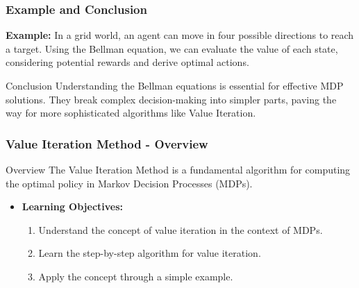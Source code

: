\documentclass[aspectratio=169]{beamer}
\begin{document}
\begin{frame}[fragile]
    \frametitle{Example and Conclusion}
    
    \textbf{Example:} In a grid world, an agent can move in four possible directions to reach a target. Using the Bellman equation, we can evaluate the value of each state, considering potential rewards and derive optimal actions.

    \begin{block}{Conclusion}
        Understanding the Bellman equations is essential for effective MDP solutions. They break complex decision-making into simpler parts, paving the way for more sophisticated algorithms like Value Iteration.
    \end{block}
\end{frame}

\begin{frame}[fragile]
    \frametitle{Value Iteration Method - Overview}
    \begin{block}{Overview}
        The Value Iteration Method is a fundamental algorithm for computing the optimal policy in Markov Decision Processes (MDPs).
    \end{block}
    \begin{itemize}
        \item \textbf{Learning Objectives:}
        \begin{enumerate}
            \item Understand the concept of value iteration in the context of MDPs.
            \item Learn the step-by-step algorithm for value iteration.
            \item Apply the concept through a simple example.
        \end{enumerate}
    \end{itemize}
\end{frame}
\end{document}
